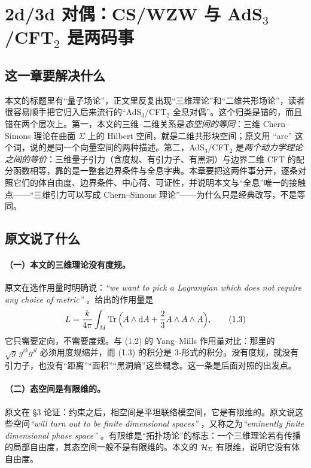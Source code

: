 \section{2d/3d 对偶：CS/WZW 与 AdS$_3$/CFT$_2$ 是两码事}
\label{sec:duality}

\subsection{这一章要解决什么}

本文的标题里有“量子场论”，正文里反复出现“三维理论”和“二维共形场论”，读者很容易顺手把它归入后来流行的“AdS$_3$/CFT$_2$ 全息对偶”。这个归类是错的，而且错在两个层次上。第一，本文的三维--二维关系是\emph{态空间的等同}：三维 Chern--Simons 理论在曲面 $\Sigma$ 上的 Hilbert 空间，就是二维共形块空间；原文用 “are” 这个词，说的是同一个向量空间的两种描述。第二，AdS$_3$/CFT$_2$ 是\emph{两个动力学理论之间的等价}：三维量子引力（含度规、有引力子、有黑洞）与边界二维 CFT 的配分函数相等，靠的是一整套边界条件与全息字典。本章要把这两件事分开，逐条对照它们的体自由度、边界条件、中心荷、可证性，并说明本文与“全息”唯一的接触点——“三维引力可以写成 Chern--Simons 理论”——为什么只是经典改写，不是等同。

\subsection{原文说了什么}

\paragraph{（一）本文的三维理论没有度规。}
原文在选作用量时明确说：\emph{“we want to pick a Lagrangian which does not require any choice of metric”} 。给出的作用量是
\begin{equation}
L=\frac{k}{4\pi}\int_M\operatorname{Tr}\Big(A\wedge \mathrm{d} A+\frac23A\wedge A\wedge A\Big), \tag{1.3}
\end{equation}
它只需要定向，不需要度规。与 (1.2) 的 Yang--Mills 作用量对比：那里的 $\sqrt g\,g^{ik}g^{jl}$ 必须用度规缩并，而 (1.3) 的积分是 3-形式的积分。没有度规，就没有引力子，也没有“距离”“面积”“黑洞熵”这些概念。这一条是后面对照的出发点。

\paragraph{（二）态空间是有限维的。}
原文在 \S3 论证：约束之后，相空间是平坦联络模空间，它是有限维的。原文说这些空间\emph{“will turn out to be finite dimensional spaces”} ，又称之为\emph{“eminently finite dimensional phase space”} 。有限维是“拓扑场论”的标志：一个三维理论若有传播的局部自由度，其态空间一般不是有限维的。本文的 $\mathcal{H}_\Sigma$ 有限维，说明它没有体自由度。

